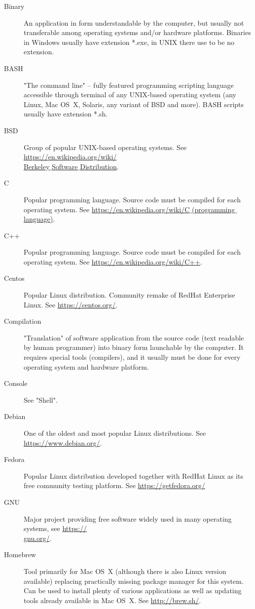 \documentclass[a4paper, 11pt, twoside]{article}
\begin{document}
\begin{description}
  \item[Binary] An application in form understandable by the computer, but usually not transferable among operating systems and/or hardware platforms. Binaries in Windows usually have extension *.exe, in UNIX there use to be no extension.
  \item[BASH] "The command line" -- fully featured programming scripting language accessible through terminal of any UNIX-based operating system (any Linux, Mac OS~X, Solaris, any variant of BSD and more). BASH scripts usually have extension *.sh.
  \item[BSD] Group of popular UNIX-based operating systems. See \href{https://en.wikipedia.org/wiki/Berkeley_Software_Distribution}{https://en.wikipedia.org/wiki/\\Berkeley$\_$Software$\_$Distribution}.
  \item[C] Popular programming language. Source code must be compiled for each operating system. See \href{https://en.wikipedia.org/wiki/C_%28programming_language%29}{https://en.wikipedia.org/wiki/C$\_$(programming$\_$language)}.
  \item[C++] Popular programming language. Source code must be compiled for each operating system. See \href{https://en.wikipedia.org/wiki/C%2B%2B}{https://en.wikipedia.org/wiki/C++}.
  \item[Centos] Popular Linux distribution. Community remake of RedHat Enterprise Linux. See \href{https://centos.org/}{https://centos.org/}.
  \item[Compilation] "Translation" of software application from the source code (text readable by human programmer) into binary form launchable by the computer. It requires special tools (compilers), and it usually must be done for every operating system and hardware platform.
  \item[Console] See "Shell".
  \item[Debian] One of the oldest and most popular Linux distributions. See \href{https://www.debian.org/}{https://www.debian.org/}.
  \item[Fedora] Popular Linux distribution developed together with RedHat Linux as its free community testing platform. See \href{https://getfedora.org/}{https://getfedora.org/}
  \item[GNU] Major project providing free software widely used in many operating systems, see \href{https://gnu.org/}{https://\\gnu.org/}.
  \item[Homebrew] Tool primarily for Mac OS~X (although there is also Linux version available) replacing practically missing package manager for this system. Can be used to install plenty of various applications as well as updating tools already available in Mac OS~X. See \href{http://brew.sh/}{http://brew.sh/}.

\end{description}
\end{document}
